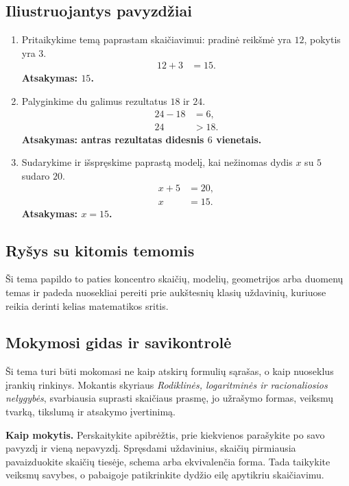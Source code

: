 \subsection{Iliustruojantys pavyzdžiai}
\begin{enumerate}[label=\arabic*.]
\item Pritaikykime temą paprastam skaičiavimui: pradinė reikšmė yra \(12\), pokytis yra \(3\).
\begin{align}
12+3&=15.
\end{align}
\textbf{Atsakymas: \(15\).}
\item Palyginkime du galimus rezultatus \(18\) ir \(24\).
\begin{align}
24-18&=6,\\
24&>18.
\end{align}
\textbf{Atsakymas: antras rezultatas didesnis \(6\) vienetais.}
\item Sudarykime ir išspręskime paprastą modelį, kai nežinomas dydis \(x\) su \(5\) sudaro \(20\).
\begin{align}
x+5&=20,\\
x&=15.
\end{align}
\textbf{Atsakymas: \(x=15\).}
\end{enumerate}

\subsection{Ryšys su kitomis temomis}
Ši tema papildo to paties koncentro skaičių, modelių, geometrijos arba duomenų temas ir padeda nuosekliai pereiti prie aukštesnių klasių uždavinių, kuriuose reikia derinti kelias matematikos sritis.

\subsection{Mokymosi gidas ir savikontrolė}

Ši tema turi būti mokomasi ne kaip atskirų formulių sąrašas, o kaip nuoseklus įrankių rinkinys. Mokantis skyriaus \textit{Rodiklinės, logaritminės ir racionaliosios nelygybės}, svarbiausia suprasti skaičiaus prasmę, jo užrašymo formas, veiksmų tvarką, tikslumą ir atsakymo įvertinimą.

\textbf{Kaip mokytis.} Perskaitykite apibrėžtis, prie kiekvienos parašykite po savo pavyzdį ir vieną nepavyzdį. Spręsdami uždavinius, skaičių pirmiausia pavaizduokite skaičių tiesėje, schema arba ekvivalenčia forma. Tada taikykite veiksmų savybes, o pabaigoje patikrinkite dydžio eilę apytikriu skaičiavimu.

